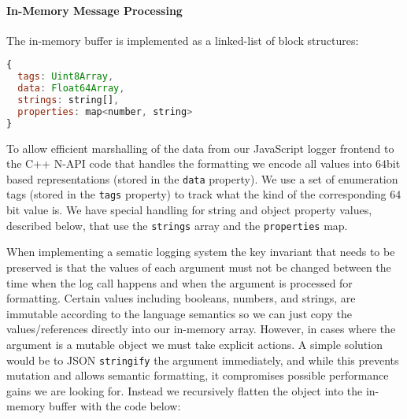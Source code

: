 \paragraph{In-Memory Message Processing}
\noindent
The in-memory buffer is implemented as a linked-list of block structures:
\begin{lstlisting}[language=JavaScript,basicstyle=\scriptsize]
{
  tags: Uint8Array,
  data: Float64Array,
  strings: string[],
  properties: map<number, string>
}
\end{lstlisting}

To allow efficient marshalling of the data from our JavaScript logger frontend 
to the C++ N-API code that handles the formatting we encode all values into 
$64$bit based representations (stored in the \texttt{data} property). We use a set 
of enumeration tags (stored in the \texttt{tags} property) to track 
what the kind of the corresponding $64$bit value is. We have special 
handling for string and object property values, described below, that use the 
\texttt{strings} array and the \texttt{properties} map.

When implementing a sematic logging system the key invariant that needs to be 
preserved is that the values of each argument must not be changed between the 
time when the log call happens and when the argument is processed for 
formatting. Certain values including booleans, numbers, and strings, are 
immutable according to the language semantics so we can just copy the 
values/references directly into our in-memory array. However, in cases where the 
argument is a mutable object we must take explicit actions. A simple solution 
would be to JSON \texttt{stringify} the argument immediately, and while this 
prevents mutation and allows semantic formatting, it compromises possible 
performance gains we are looking for. Instead we recursively flatten the object 
into the in-memory buffer with the code below:



